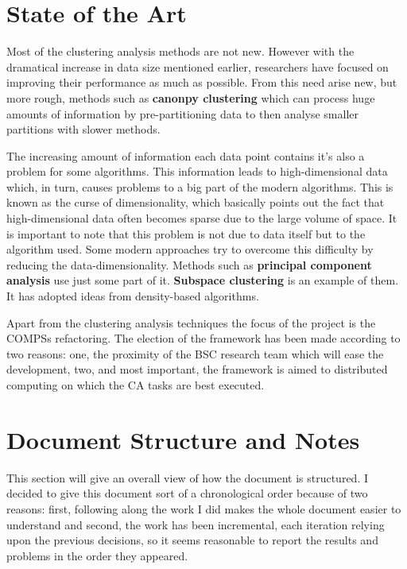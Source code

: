 \section{State of the Art}


Most of the clustering analysis methods are not new. However with the dramatical increase in data size mentioned earlier, researchers have focused on improving their performance as much as possible. From this need arise new, but more rough, methods such as \textbf{canonpy clustering} \cite{Nayak2015} which can process huge amounts of information by pre-partitioning data to then analyse smaller partitions with slower methods.

The increasing amount of information each data point contains it's also a problem for some algorithms. This information leads to high-dimensional data which, in turn, causes problems to a big part of the modern algorithms. This is known as the curse of dimensionality, which basically points out the fact that high-dimensional data often becomes sparse due to the large volume of space. It is important to note that this problem is not due to data itself but to the algorithm used. Some modern approaches try to overcome this difficulty by reducing the data-dimensionality. Methods such as \textbf{principal component analysis} \cite{Kupski2015} use just some part of it. \textbf{Subspace clustering} \cite{Adler2015} is an example of them. It has adopted ideas from density-based algorithms.

Apart from the clustering analysis techniques the focus of the project is the COMPSs refactoring. The election of the framework has been made according to two reasons: one, the proximity of the BSC research team which will ease the development, two, and most important, the framework is aimed to distributed computing on which the CA tasks are best executed. 


\section{Document Structure and Notes}

This section will give an overall view of how the document is structured. I decided to give this document sort of a chronological order because of two reasons: first, following along the work I did makes the whole document easier to understand and second, the work has been incremental, each iteration relying upon the previous decisions, so it seems reasonable to report the results and problems in the order they appeared. 


